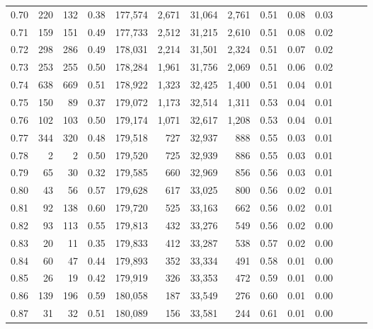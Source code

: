 \begin{tabular}{rrrrrrrrrrrrrr}
0.70 &     220 &    132 &  0.38 &  177,574 &    2,671 &  31,064 &   2,761 &  0.51 &  0.08 &      0.03 \\
0.71 &     159 &    151 &  0.49 &  177,733 &    2,512 &  31,215 &   2,610 &  0.51 &  0.08 &      0.02 \\
0.72 &     298 &    286 &  0.49 &  178,031 &    2,214 &  31,501 &   2,324 &  0.51 &  0.07 &      0.02 \\
0.73 &     253 &    255 &  0.50 &  178,284 &    1,961 &  31,756 &   2,069 &  0.51 &  0.06 &      0.02 \\
0.74 &     638 &    669 &  0.51 &  178,922 &    1,323 &  32,425 &   1,400 &  0.51 &  0.04 &      0.01 \\
0.75 &     150 &     89 &  0.37 &  179,072 &    1,173 &  32,514 &   1,311 &  0.53 &  0.04 &      0.01 \\
0.76 &     102 &    103 &  0.50 &  179,174 &    1,071 &  32,617 &   1,208 &  0.53 &  0.04 &      0.01 \\
0.77 &     344 &    320 &  0.48 &  179,518 &      727 &  32,937 &     888 &  0.55 &  0.03 &      0.01 \\
0.78 &       2 &      2 &  0.50 &  179,520 &      725 &  32,939 &     886 &  0.55 &  0.03 &      0.01 \\
0.79 &      65 &     30 &  0.32 &  179,585 &      660 &  32,969 &     856 &  0.56 &  0.03 &      0.01 \\
0.80 &      43 &     56 &  0.57 &  179,628 &      617 &  33,025 &     800 &  0.56 &  0.02 &      0.01 \\
0.81 &      92 &    138 &  0.60 &  179,720 &      525 &  33,163 &     662 &  0.56 &  0.02 &      0.01 \\
0.82 &      93 &    113 &  0.55 &  179,813 &      432 &  33,276 &     549 &  0.56 &  0.02 &      0.00 \\
0.83 &      20 &     11 &  0.35 &  179,833 &      412 &  33,287 &     538 &  0.57 &  0.02 &      0.00 \\
0.84 &      60 &     47 &  0.44 &  179,893 &      352 &  33,334 &     491 &  0.58 &  0.01 &      0.00 \\
0.85 &      26 &     19 &  0.42 &  179,919 &      326 &  33,353 &     472 &  0.59 &  0.01 &      0.00 \\
0.86 &     139 &    196 &  0.59 &  180,058 &      187 &  33,549 &     276 &  0.60 &  0.01 &      0.00 \\
0.87 &      31 &     32 &  0.51 &  180,089 &      156 &  33,581 &     244 &  0.61 &  0.01 &      0.00 \\

\end{tabular}
